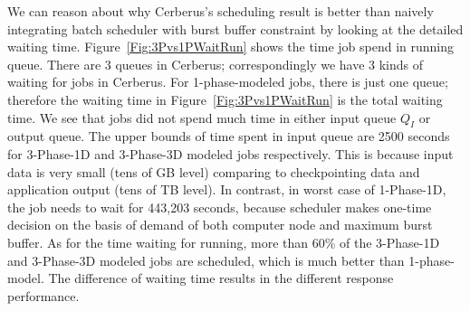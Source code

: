 We can reason about why Cerberus's scheduling result is better than
naively integrating batch scheduler with burst buffer constraint
by looking at the detailed waiting time.
Figure~\ref{Fig:3Pvs1PWaitRun} shows the time job spend in running queue.
There are 3 queues in Cerberus;
correspondingly we have 3 kinds of waiting for jobs in Cerberus.
For 1-phase-modeled jobs, there is just one queue;
therefore the waiting time in Figure~\ref{Fig:3Pvs1PWaitRun} is the total waiting time.
We see that jobs did not spend much time in either input queue $Q_I$ or output queue.
The upper bounds of time spent in input queue are
2500 seconds for 3-Phase-1D and 3-Phase-3D modeled jobs respectively.
This is because input data is very small (tens of GB level)
comparing to checkpointing data and application output (tens of TB level).
In contrast, in worst case of 1-Phase-1D, the job needs to wait for 443,203 seconds,
because scheduler makes one-time decision on the basis of demand of
both computer node and maximum burst buffer.
As for the time waiting for running, 
more than 60\% of the 3-Phase-1D and 3-Phase-3D modeled jobs are scheduled, 
which is much better than 1-phase-model.
The difference of waiting time results in the different
response performance.



